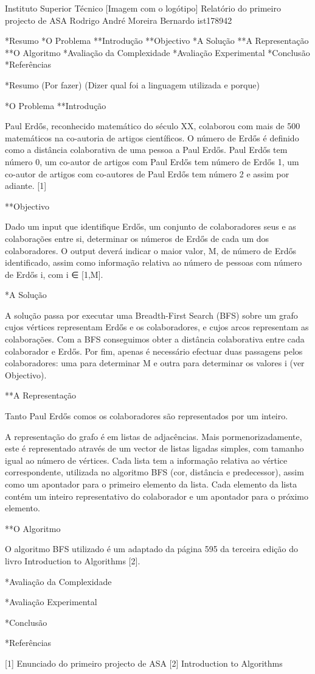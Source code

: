 Instituto Superior Técnico
[Imagem com o logótipo]
Relatório do primeiro projecto de ASA
Rodrigo André Moreira Bernardo
ist178942

*Resumo
*O Problema
**Introdução
**Objectivo
*A Solução
**A Representação
**O Algoritmo
*Avaliação da Complexidade
*Avaliação Experimental
*Conclusão
*Referências

*Resumo
           (Por fazer)
(Dizer qual foi a linguagem utilizada e porque)


*O Problema
**Introdução

Paul Erdős, reconhecido matemático do século XX, colaborou com mais de 500
matemáticos na co-autoria de artigos científicos.
O número de Erdős é definido como a distância colaborativa de uma pessoa a Paul
Erdős. Paul Erdős tem número 0, um co-autor de artigos com Paul Erdős tem número
de Erdős 1, um co-autor de artigos com co-autores de Paul Erdős tem número 2 e
assim por adiante. [1]

**Objectivo

Dado um input que identifique Erdős, um conjunto de colaboradores seus e as
colaborações entre si, determinar os números de Erdős de cada um dos
colaboradores. O output deverá indicar o maior valor, M, de número de Erdős
identificado, assim como informação relativa ao número de pessoas com número de
Erdős i, com i ∈ [1,M].


*A Solução

A solução passa por executar uma Breadth-First Search (BFS) sobre um grafo cujos
vértices representam Erdős e os colaboradores, e cujos arcos representam as
colaborações. Com a BFS conseguimos obter a distância colaborativa entre cada
colaborador e Erdős. Por fim, apenas é necessário efectuar duas passagens pelos
colaboradores: uma para determinar M e outra para determinar os valores i (ver
Objectivo).

**A Representação

Tanto Paul Erdős comos os colaboradores são representados por um inteiro.

A representação do grafo é em listas de adjacências. Mais pormenorizadamente,
este é representado através de um vector de listas ligadas simples, com tamanho
igual ao número de  vértices. Cada lista tem a informação relativa ao vértice
correspondente, utilizada no algoritmo BFS (cor, distância e predecessor), assim
como um apontador para o primeiro elemento da lista. Cada elemento da lista
contém um inteiro representativo do colaborador e um apontador para o próximo
elemento.

**O Algoritmo

O algoritmo BFS utilizado é um adaptado da página 595 da terceira edição do
livro Introduction to Algorithms [2].


*Avaliação da Complexidade

*Avaliação Experimental

*Conclusão

*Referências

[1] Enunciado do primeiro projecto de ASA
[2] Introduction to Algorithms
